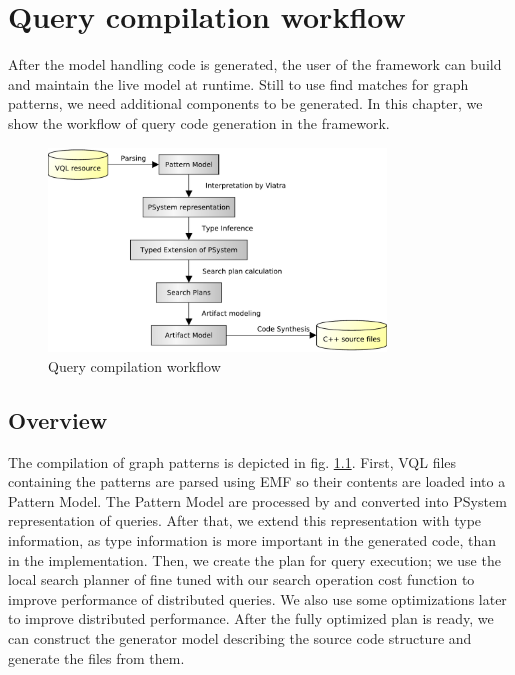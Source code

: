 

\chapter{Query compilation workflow}

After the model handling code is generated, the user of the framework can build and maintain the live model at runtime. 
Still to use find matches for graph patterns, we need additional components to be generated. 
In this chapter, we show the workflow of query code generation in the framework. 


\begin{figure}[H]
	\begin{center}
		\includegraphics[width=0.8\textwidth]{figures/query-compilation-workflow.pdf}
		\caption{Query compilation workflow}
		\label{figure:query-compile-workflow}
	\end{center}
\end{figure}


\section{Overview}

The compilation of graph patterns is depicted in fig. \ref{figure:query-compile-workflow}. 
First, VQL files containing the patterns are parsed using EMF so their contents are loaded into a Pattern Model.
The Pattern Model are processed by \viatra{} and converted into PSystem representation of queries.
After that, we extend this representation with type information, as type information is more important in the \cpp{} generated code, than in the \viatra{} implementation.
Then, we create the plan for query execution; we use the local search planner of \viatra{} fine tuned with our search operation cost function to improve performance of distributed queries. 
We also use some optimizations later to improve distributed performance. 
After the fully optimized plan is ready, we can construct the generator model describing the source code structure and generate the \cpp{} files from them.




